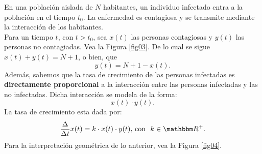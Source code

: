 \begin{example}{}{}
    En una población aislada de $N$ habitantes, un individuo infectado entra a la población en el tiempo $t_0$. La enfermedad es contagiosa y se transmite mediante la interacción de los habitantes. \\
    \solucion Para un tiempo $t$, con $t > t_0$, sea $x(t)$ las personas contagiosas y $y(t)$ las personas no contagiadas. Vea la Figura \ref{fig03}. De lo cual se sigue $x(t) + y(t) = N + 1$, o bien, que
    \begin{equation}
        y(t) = N + 1 - x(t). \label{ec07}
    \end{equation}
    Además, sabemos que la tasa de crecimiento de las personas infectadas es \textbf{directamente proporcional} a la interacción entre las personas infectadas y las no infectadas. Dicha interacción se modela de la forma:
    $$x(t) \cdot y(t).$$
    La tasa de crecimiento esta dada por:
    \begin{equation}
        \frac{\Delta}{\Delta t}x(t) = k \cdot x(t) \cdot y(t), \, \text{con } \ k \in \RR^+. \label{ec08}
    \end{equation}
    Para la interpretación geométrica de lo anterior, vea la Figura \ref{fig04}.
    \begin{figure}
        \centering
\end{figure}
\end{example}
